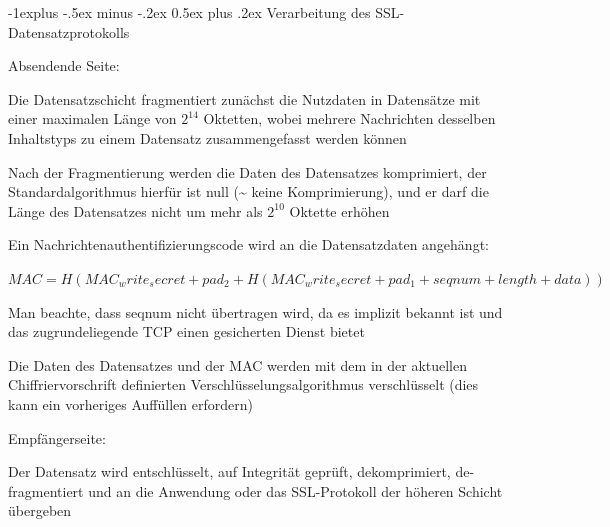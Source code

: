 \documentclass[a4paper]{article}
\makeatletter
\renewcommand{\subsection}{\@startsection{subsection}{2}{0mm}%
 {-1explus -.5ex minus -.2ex}%
 {0.5ex plus .2ex}%
 {\normalfont\normalsize\bfseries}}
\makeatother
\begin{document}
\begin{multicols}{3}
      \subsection{Verarbeitung des SSL-Datensatzprotokolls}
      \begin{itemize*}
            \item Absendende Seite:
            \begin{itemize*}
                  \item Die Datensatzschicht fragmentiert zunächst die Nutzdaten in Datensätze mit einer maximalen Länge von $2^{14}$ Oktetten, wobei mehrere Nachrichten desselben Inhaltstyps zu einem Datensatz zusammengefasst werden können
                  \item Nach der Fragmentierung werden die Daten des Datensatzes komprimiert, der Standardalgorithmus hierfür ist null (\textasciitilde{} keine Komprimierung), und er darf die Länge des Datensatzes nicht um mehr als $2^{10}$ Oktette erhöhen
                  \item Ein Nachrichtenauthentifizierungscode wird an die Datensatzdaten angehängt:
                  \begin{itemize*}
                        \item $MAC = H(MAC_write_secret + pad_2 + H(MAC_write_secret + pad_1 + seqnum + length + data))$
                        \item Man beachte, dass seqnum nicht übertragen wird, da es implizit bekannt ist und das zugrundeliegende TCP einen gesicherten Dienst bietet
                  \end{itemize*}
                  \item Die Daten des Datensatzes und der MAC werden mit dem in der aktuellen Chiffriervorschrift definierten Verschlüsselungsalgorithmus verschlüsselt (dies kann ein vorheriges Auffüllen erfordern)
            \end{itemize*}
            \item Empfängerseite:
            \begin{itemize*}
                  \item Der Datensatz wird entschlüsselt, auf Integrität geprüft, dekomprimiert, de-fragmentiert und an die Anwendung oder das SSL-Protokoll der höheren Schicht übergeben
            \end{itemize*}
      \end{itemize*}


\end{multicols}
\end{document}
